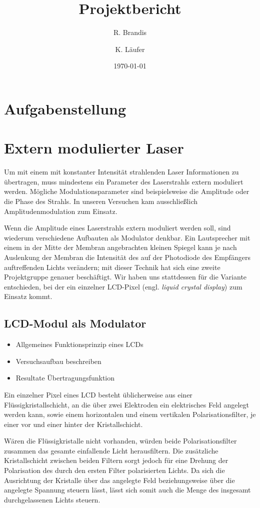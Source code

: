 \documentclass[12pt,a4paper]{article}
\title{Projektbericht}
\author{R. Brandis \and K. Läufer}
\date{\today}
\begin{document}
\maketitle
\newpage
\tableofcontents
\newpage

\section{Aufgabenstellung}

\section{Extern modulierter Laser}
Um mit einem mit konstanter Intensität strahlenden Laser Informationen zu übertragen, muss mindestens ein Parameter des Laserstrahls extern moduliert werden. Mögliche Modulationsparameter sind beispielsweise die Amplitude oder die Phase des Strahls. In unseren Versuchen kam ausschließlich Amplitudenmodulation zum Einsatz.

Wenn die Amplitude eines Laserstrahls extern moduliert werden soll, sind wiederum verschiedene Aufbauten als Modulator denkbar. Ein Lautsprecher mit einem in der Mitte der Membran angebrachten kleinen Spiegel kann je nach Auslenkung der Membran die Intensität des auf der Photodiode des Empfängers auftreffenden Lichts verändern; mit dieser Technik hat sich eine zweite Projektgruppe genauer beschäftigt. Wir haben uns stattdessen für die Variante entschieden, bei der ein einzelner LCD-Pixel (engl. \textit{liquid crystal display}) zum Einsatz kommt.

\subsection{LCD-Modul als Modulator}
\begin{itemize}
\item Allgemeines Funktionsprinzip eines LCDs
\item Versuchsaufbau beschreiben
\item Resultate Übertragungsfunktion
\end{itemize}
Ein einzelner Pixel eines LCD besteht üblicherweise aus einer Flüssigkristallschicht, an die über zwei Elektroden ein elektrisches Feld angelegt werden kann, sowie einem horizontalen und einem vertikalen Polarisationsfilter, je einer vor und einer hinter der Kristallschicht.

Wären die Flüssigkristalle nicht vorhanden, würden beide Polarisationsfilter zusammen das gesamte einfallende Licht herausfiltern. Die zusätzliche Kristallschicht zwischen beiden Filtern sorgt jedoch für eine Drehung der Polarisation des durch den ersten Filter polarisierten Lichts. Da sich die Ausrichtung der Kristalle über das angelegte Feld beziehungsweise über die angelegte Spannung steuern lässt, lässt sich somit auch die Menge des insgesamt durchgelassenen Lichts steuern.
\end{document}

